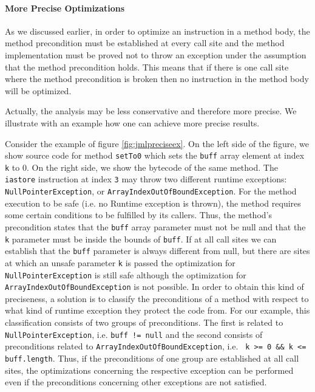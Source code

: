 \paragraph{More Precise Optimizations}

\label{section:optimprecise}

As we discussed earlier, in order to optimize an instruction in a method body, the method precondition must be established at every call site and the method implementation must be proved not to throw an exception under the assumption that the method precondition holds. This means that if there is one call site where the method precondition is broken then no instruction in the method body will be optimized.

Actually, the analysis may be less conservative and therefore more precise. We illustrate with an example how
one can achieve more precise results.

Consider the example of figure \ref{fig:jmlpreciseex}. On the left side of the figure, we show source code for method \verb!setTo0! which sets the \verb!buff! array element at index \verb!k! to 0. On the right side, we show the bytecode of the same method. The \texttt{iastore} instruction at index \texttt{3} may throw two different runtime exceptions: \texttt{NullPointerException}, or \texttt{ArrayIndexOutOfBoundException}. For the method execution to be safe (i.e. no Runtime exception is thrown), the method requires some certain conditions to be fulfilled by its callers. Thus, the method's precondition states that the \verb!buff! array parameter must not be null and that the \verb!k! parameter must be inside the bounds of \verb!buff!. If at all call sites we can establish that the \verb!buff! parameter is always different from null, but there are sites at which an unsafe parameter \verb!k! is passed the optimization for \texttt{NullPointerException} is still safe although the optimization for \texttt{ArrayIndexOutOfBoundException} is not possible. In order to obtain this kind of preciseness, a solution is to classify the preconditions of a method with respect to what kind of runtime exception they protect the code from. For our example, this classification consists of two groups of preconditions. The first is related to \texttt{NullPointerException}, i.e. \texttt{buff != null} and the second consists of preconditions related to \texttt{ArrayIndexOutOfBoundException}, i.e. \verb! k >= 0 && k <= buff.length!. Thus, if the preconditions of one group are established at all call sites, the optimizations concerning the respective exception can be performed even if the preconditions concerning other exceptions are not satisfied.

